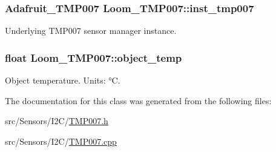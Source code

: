 \subsubsection[{\texorpdfstring{inst\+\_\+tmp007}{inst_tmp007}}]{\setlength{\rightskip}{0pt plus 5cm}Adafruit\+\_\+\+T\+M\+P007 Loom\+\_\+\+T\+M\+P007\+::inst\+\_\+tmp007\hspace{0.3cm}{\ttfamily [protected]}}\hypertarget{class_loom___t_m_p007_ab32371c9649b51b8592d2a783617cf97}{}\label{class_loom___t_m_p007_ab32371c9649b51b8592d2a783617cf97}


Underlying T\+M\+P007 sensor manager instance. 

\subsubsection[{\texorpdfstring{object\+\_\+temp}{object_temp}}]{\setlength{\rightskip}{0pt plus 5cm}float Loom\+\_\+\+T\+M\+P007\+::object\+\_\+temp\hspace{0.3cm}{\ttfamily [protected]}}\hypertarget{class_loom___t_m_p007_ae75459c624c69fd36cf699200ead2c8a}{}\label{class_loom___t_m_p007_ae75459c624c69fd36cf699200ead2c8a}


Object temperature. Units\+: °C. 



The documentation for this class was generated from the following files\+:\begin{DoxyCompactItemize}
\item 
src/\+Sensors/\+I2\+C/\hyperlink{_t_m_p007_8h}{T\+M\+P007.\+h}\item 
src/\+Sensors/\+I2\+C/\hyperlink{_t_m_p007_8cpp}{T\+M\+P007.\+cpp}\end{DoxyCompactItemize}
